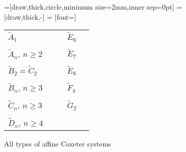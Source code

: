 \begin{figure}
	\centering
	=[draw,thick,circle,minimum size=2mm,inner sep=0pt]
	 = [draw,thick,-]
	 = [font=\small]

	\begin{tabular}{MMcMM}
	$\tilde A_1$
	&
	\tildeAone
	&
	\hspace*{\cgpadh}
	&
	$\tilde E_6$
	&
	\tildeEsix
	\\
	\vspace*{\cgpadv}
	\\
	$\tilde A_n$, {\tiny $n \geq 2$}
	&
	\tildeAn
	&
	\hspace*{\cgpadh}
	&
	$\tilde E_7$
	&
	\tildeEseven
	\\
	\vspace*{\cgpadv}
	\\
	$\tilde B_2 = \tilde C_2$
	&
	\tildeBCtwo
	&
	\hspace*{\cgpadh}
	&
	$\tilde E_8$
	&
	\tildeEeight
	\\
	\vspace*{\cgpadv}
	\\
	$\tilde B_n$, {\tiny $n \geq 3$}
	&
	\tildeBn
	&
	\hspace*{\cgpadh}
	&
	$\tilde F_4$
	&
	\tildeFfour
	\\
	\vspace*{\cgpadv}
	\\
	$\tilde C_n$, {\tiny $n \geq 3$}
	&
	\tildeCn
	&
	\hspace*{\cgpadh}
	&
	$\tilde G_2$
	&
	\tildeGtwo
	\\
	\vspace*{\cgpadv}
	\\
	$\tilde D_n$, {\tiny $n \geq 4$}
	&
	\tildeDn
	\end{tabular}
	\caption{All types of affine Coxeter systems}
	\label{fig:affine-coxeter-systems}
\end{figure}


